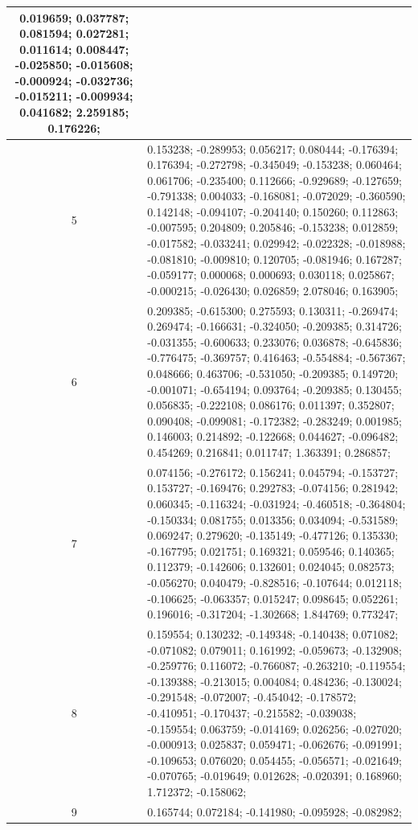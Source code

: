 {\begin{longtable}[h]{| c | p{} |}
	0.019659; 0.037787; 0.081594; 0.027281; 0.011614; 0.008447; -0.025850;
	-0.015608; -0.000924; -0.032736; -0.015211; -0.009934; 0.041682; 2.259185;
	0.176226; \\ \hline 
	5 & 0.153238; -0.289953; 0.056217; 0.080444; -0.176394;
	0.176394; -0.272798; -0.345049; -0.153238; 0.060464; 0.061706; -0.235400;
	0.112666; -0.929689; -0.127659; -0.791338; 0.004033; -0.168081; -0.072029;
	-0.360590; 0.142148; -0.094107; -0.204140; 0.150260; 0.112863; -0.007595;
	0.204809; 0.205846; -0.153238; 0.012859; -0.017582; -0.033241; 0.029942;
	-0.022328; -0.018988; -0.081810; -0.009810; 0.120705; -0.081946; 0.167287;
	-0.059177; 0.000068; 0.000693; 0.030118; 0.025867; -0.000215; -0.026430;
	0.026859; 2.078046; 0.163905; \\ \hline 
	6 & 0.209385; -0.615300; 0.275593;
	0.130311; -0.269474; 0.269474; -0.166631; -0.324050; -0.209385; 0.314726;
	-0.031355; -0.600633; 0.233076; 0.036878; -0.645836; -0.776475; -0.369757;
	0.416463; -0.554884; -0.567367; 0.048666; 0.463706; -0.531050; -0.209385;
	0.149720; -0.001071; -0.654194; 0.093764; -0.209385; 0.130455; 0.056835;
	-0.222108; 0.086176; 0.011397; 0.352807; 0.090408; -0.099081; -0.172382;
	-0.283249; 0.001985; 0.146003; 0.214892; -0.122668; 0.044627; -0.096482;
	0.454269; 0.216841; 0.011747; 1.363391; 0.286857; \\ \hline 
	7 & 0.074156;
	-0.276172; 0.156241; 0.045794; -0.153727; 0.153727; -0.169476; 0.292783;
	-0.074156; 0.281942; 0.060345; -0.116324; -0.031924; -0.460518; -0.364804;
	-0.150334; 0.081755; 0.013356; 0.034094; -0.531589; 0.069247; 0.279620;
	-0.135149; -0.477126; 0.135330; -0.167795; 0.021751; 0.169321; 0.059546;
	0.140365; 0.112379; -0.142606; 0.132601; 0.024045; 0.082573; -0.056270;
	0.040479; -0.828516; -0.107644; 0.012118; -0.106625; -0.063357; 0.015247;
	0.098645; 0.052261; 0.196016; -0.317204; -1.302668; 1.844769; 0.773247;\\ \hline
	8 & 0.159554; 0.130232; -0.149348; -0.140438; 0.071082; -0.071082; 0.079011;
	0.161992; -0.059673; -0.132908; -0.259776; 0.116072; -0.766087; -0.263210;
	-0.119554; -0.139388; -0.213015; 0.004084; 0.484236; -0.130024; -0.291548;
	-0.072007; -0.454042; -0.178572; -0.410951; -0.170437; -0.215582; -0.039038;
	-0.159554; 0.063759; -0.014169; 0.026256; -0.027020; -0.000913; 0.025837;
	0.059471; -0.062676; -0.091991; -0.109653; 0.076020; 0.054455; -0.056571;
	-0.021649; -0.070765; -0.019649; 0.012628; -0.020391; 0.168960; 1.712372;
	-0.158062;\\ \hline 
	9 & 0.165744; 0.072184; -0.141980; -0.095928; -0.082982;

\end{longtable}}
